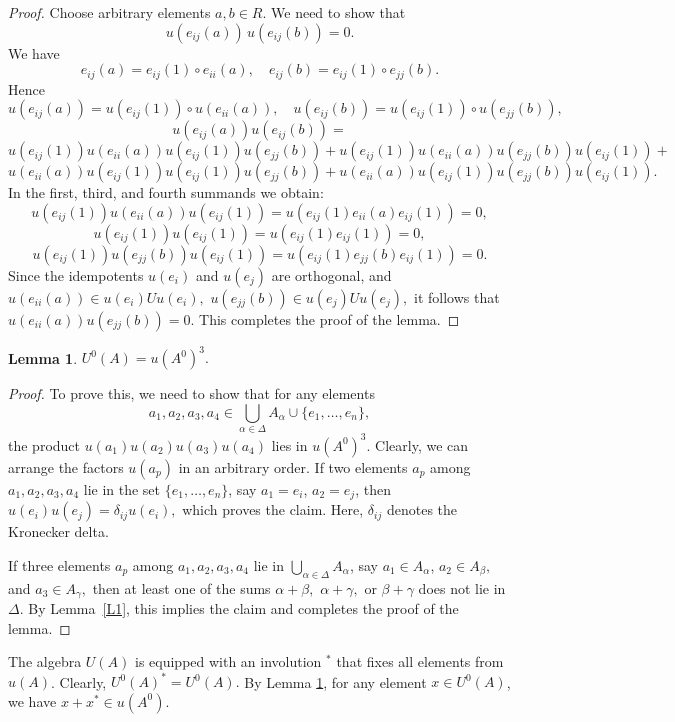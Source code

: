 \documentclass[12pt]{amsart}
\newtheorem{lem}{Lemma}
\begin{document}
{\begin{proof}
Choose arbitrary elements $a, b \in R$. We need to show that 
\[
u(e_{ij}(a)) \, u(e_{ij}(b)) = 0.
\]
We have 
\[
e_{ij}(a) = e_{ij}(1) \circ e_{ii}(a), 
\quad e_{ij}(b) = e_{ij}(1) \circ e_{jj}(b).
\]
Hence
\[
u(e_{ij}(a)) = u(e_{ij}(1)) \circ u(e_{ii}(a)), 
\quad u(e_{ij}(b)) = u(e_{ij}(1)) \circ u(e_{jj}(b)),
\]
\[	u(e_{ij}(a)) u(e_{ij}(b)) 
	= \]
	\[ u(e_{ij}(1)) u(e_{ii}(a)) u(e_{ij}(1)) u(e_{jj}(b)) + u(e_{ij}(1)) u(e_{ii}(a))  u(e_{jj}(b)) u(e_{ij}(1)) 
 +  \]
 \[ u(e_{ii}(a)) u(e_{ij}(1)) u(e_{ij}(1))  u(e_{jj}(b)) +  u(e_{ii}(a)) u(e_{ij}(1)) u(e_{jj}(b)) u(e_{ij}(1)).
\]
In the first, third, and fourth summands we obtain:
\[
u(e_{ij}(1)) u(e_{ii}(a)) u(e_{ij}(1)) = 
u\!\left( e_{ij}(1) e_{ii}(a) e_{ij}(1) \right) = 0,
\]
\[
u(e_{ij}(1)) u(e_{ij}(1)) = 
u\!\left( e_{ij}(1) e_{ij}(1) \right) = 0,
\]
\[
u(e_{ij}(1)) u(e_{jj}(b)) u(e_{ij}(1)) = 
u\!\left( e_{ij}(1) e_{jj}(b) e_{ij}(1) \right) = 0.
\]
Since the idempotents  $u(e_i)$ and $u(e_j)$ are orthogonal, and $u(e_{ii}(a))\in u(e_i)U u(e_i),$ $u(e_{jj}(b))\in u(e_j)U u(e_j),$ it follows that $u(e_{ii}(a)) u(e_{jj}(b))=0.$ This completes the proof of the lemma. \end{proof}




\begin{lem}\label{L2} $U^0(A) =u(A^0)^3.$ \end{lem}

\begin{proof} To prove this, we need  to show that for any elements $$a_1, a_2, a_3, a_4 \in \bigcup_{\alpha \in \Delta} A_\alpha \cup \{e_1, \ldots, e_n\},  $$ the product $u(a_1) u(a_2) u(a_3) u(a_4)$ 
lies in $u(A^0)^3$. Clearly, we can arrange the factors $u(a_p)$ in an arbitrary order. If two elements  $a_p$ among $a_1, a_2, a_3, a_4 $ lie in the set $\{e_1, \ldots, e_n\}$, say $a_1 = e_i$, $a_2 = e_j$, then
$u(e_i) u(e_j) = \delta_{ij} u(e_i),$  which proves the claim. Here, $\delta_{ij}$ denotes the Kronecker delta.

If three elements $a_p$ among $a_1, a_2, a_3, a_4$ lie in 	$\bigcup_{\alpha \in \Delta} A_\alpha$, say $a_1\in A_\alpha$, $a_2 \in A_\beta,$ and  $a_3 \in A_\gamma,$  then at least one of the sums $ \alpha +\beta,$ $\alpha+ \gamma,$ or $\beta+ \gamma$ does not lie in $\Delta$. By Lemma~\ref{L1}, this implies the claim and completes the proof of the lemma. \end{proof}

The algebra $U(A)$ is equipped with an involution $^*$ that  fixes all elements from $u(A)$. Clearly, $U^0(A)^* =U^0(A).$ By Lemma \ref{L2}, for any element $x \in U^0(A)$, we have $x + x^* \in u(A^0).$


}
\end{document}
